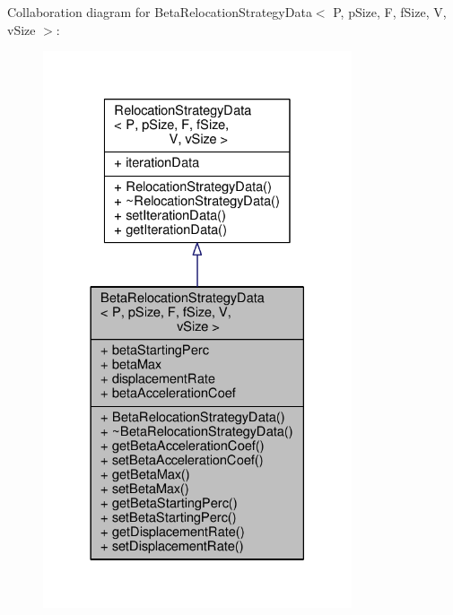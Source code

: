 Collaboration diagram for Beta\+Relocation\+Strategy\+Data$<$ P, p\+Size, F, f\+Size, V, v\+Size $>$\+:
\nopagebreak
\begin{figure}[H]
\begin{center}
\leavevmode
\includegraphics[width=258pt]{structBetaRelocationStrategyData__coll__graph}
\end{center}
\end{figure}
